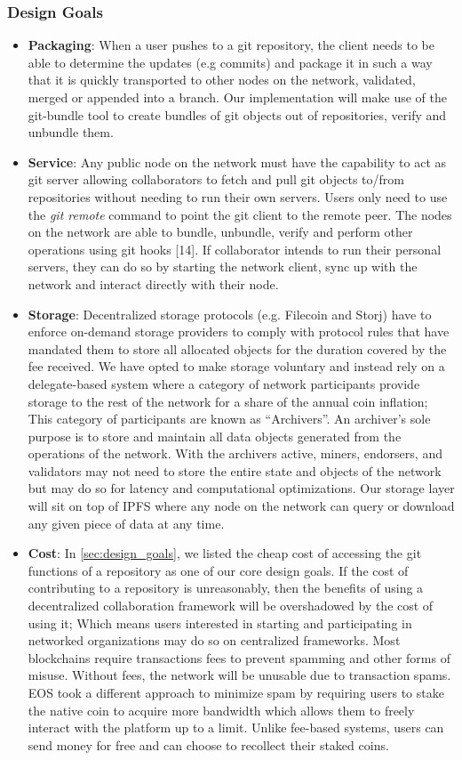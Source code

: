 \subsubsection{Design Goals}
\begin{itemize}
	\item \textbf{Packaging}: When a user pushes to a git repository, the client needs to be able to determine the updates (e.g commits) and package it in such a way that it is quickly transported to other nodes on the network, validated, merged or appended into a branch. Our implementation will make use of the git-bundle tool to create bundles of git objects out of repositories, verify and unbundle them.
	\item \textbf{Service}: Any public node on the network must have the capability to act as git server allowing collaborators to fetch and pull git objects to/from repositories without needing to run their own servers. Users only need to use the \textit{git remote} command to point the git client to the remote peer. The nodes on the network are able to bundle, unbundle, verify and perform other operations using git hooks [14]. If collaborator intends to run their personal servers, they can do so by starting the network client, sync up with the network and interact directly with their node.
	\item \textbf{Storage}: Decentralized storage protocols (e.g. Filecoin and Storj) have to enforce on-demand storage providers to comply with protocol rules that have mandated them to store all allocated objects for the duration covered by the fee received. We have opted to make storage voluntary and instead rely on a delegate-based system where a category of network participants provide storage to the rest of the network for a share of the annual coin inflation; This category of participants are known as “Archivers”. An archiver’s sole purpose is to store and maintain all data objects generated from the operations of the network. With the archivers active, miners, endorsers, and validators may not need to store the entire state and objects of the network but may do so for latency and computational optimizations. Our storage layer will sit on top of IPFS where any node on the network can query or download any given piece of data at any time.
	\item \textbf{Cost}: In \autoref{sec:design_goals}, we listed the cheap cost of accessing the git functions of a repository as one of our core design goals. If the cost of contributing to a repository is unreasonably, then the benefits of using a decentralized collaboration framework will be overshadowed by the cost of using it; Which means users interested in starting and participating in networked organizations may do so on centralized frameworks. Most blockchains require transactions fees to prevent spamming and other forms of misuse. Without fees, the network will be unusable due to transaction spams. EOS took a different approach to minimize spam by requiring users to stake the native coin to acquire more bandwidth which allows them to freely interact with the platform up to a limit. Unlike fee-based systems, users can send money for free and can choose to recollect their staked coins.
\end{itemize}

